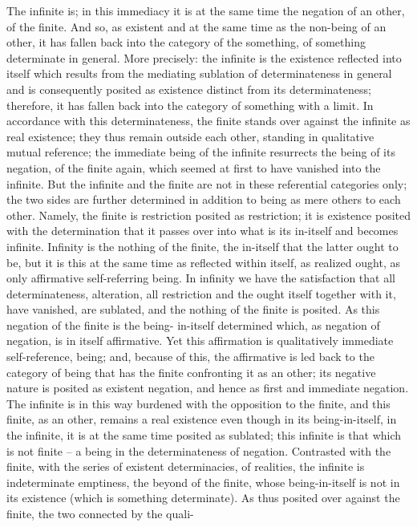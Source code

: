 The infinite is; in this immediacy it is at the same time the negation of
an other, of the finite. And so, as existent and at the same time as the
non-being of an other, it has fallen back into the category of the something,
of something determinate in general. More precisely: the infinite is the
existence reflected into itself which results from the mediating sublation of
determinateness in general and is consequently posited as existence distinct
from its determinateness; therefore, it has fallen back into the category of
something with a limit. In accordance with this determinateness, the finite
stands over against the infinite as real existence; they thus remain outside
each other, standing in qualitative mutual reference; the immediate being of
the infinite resurrects the being of its negation, of the finite again, which
seemed at first to have vanished into the infinite.
But the infinite and the finite are not in these referential categories only;
the two sides are further determined in addition to being as mere others
to each other. Namely, the finite is restriction posited as restriction; it is
existence posited with the determination that it passes over into what is its
in-itself and becomes infinite. Infinity is the nothing of the finite, the in-itself
that the latter ought to be, but it is this at the same time as reflected within
itself, as realized ought, as only affirmative self-referring being. In infinity
we have the satisfaction that all determinateness, alteration, all restriction
and the ought itself together with it, have vanished, are sublated, and the
nothing of the finite is posited. As this negation of the finite is the being-
in-itself determined which, as negation of negation, is in itself affirmative.
Yet this affirmation is qualitatively immediate self-reference, being; and,
because of this, the affirmative is led back to the category of being that has
the finite confronting it as an other; its negative nature is posited as existent
negation, and hence as first and immediate negation. The infinite is in this
way burdened with the opposition to the finite, and this finite, as an other,
remains a real existence even though in its being-in-itself, in the infinite,
it is at the same time posited as sublated; this infinite is that which is not
finite – a being in the determinateness of negation. Contrasted with the
finite, with the series of existent determinacies, of realities, the infinite is
indeterminate emptiness, the beyond of the finite, whose being-in-itself is
not in its existence (which is something determinate).
As thus posited over against the finite, the two connected by the quali-
